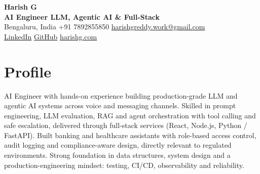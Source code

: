 \documentclass[10pt,a4paper]{article}
\begin{document}
{\LARGE\bfseries Harish G}\\[2pt]
{\large\bfseries AI Engineer \textbar{} LLM, Agentic AI \& Full-Stack}\\[3pt]
Bengaluru, India \quad\textbar\quad +91 7892855850 \quad\textbar\quad
\href{mailto:harishgreddy.work@gmail.com}{harishgreddy.work@gmail.com}\\[1pt]
\href{https://www.linkedin.com/in/harishgreddy/}{LinkedIn} \quad\textbar\quad \href{https://github.com/harish00506/}{GitHub} \quad\textbar\quad \href{https://www.harishg.com}{harishg.com}

\section{Profile}
AI Engineer with hands-on experience building production-grade LLM and agentic AI systems across voice
and messaging channels. Skilled in prompt engineering, LLM evaluation, RAG and agent orchestration with
tool calling and safe escalation, delivered through full-stack services (React, Node.js, Python / FastAPI).
Built banking and healthcare assistants with role-based access control, audit logging and
compliance-aware design, directly relevant to regulated environments. Strong foundation in data
structures, system design and a production-engineering mindset: testing, CI/CD, observability and
reliability.

\end{document}

